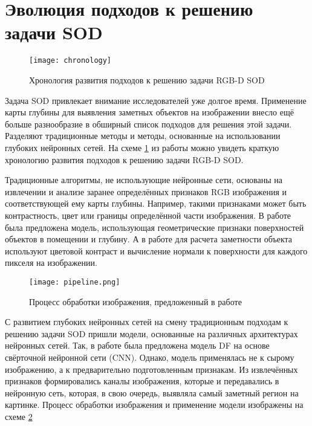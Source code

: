 \section{Эволюция подходов к решению задачи SOD}

\begin{figure}
    \centering
    \texttt{[image: chronology]}
    \caption{Хронология развития подходов к решению задачи RGB-D SOD}
    \label{fig:chronology}
\end{figure}

Задача SOD привлекает внимание исследователей уже долгое время. Применение карты глубины для выявления заметных объектов на изображении
внесло ещё больше разнообразие в обширный список подходов для решения этой задачи. Разделяют традиционные методы и методы, основанные
на использовании глубоких нейронных сетей. На схеме \ref{fig:chronology} из работы \cite{Survey} можно увидеть краткую хронологию развития
подходов к решению задачи RGB-D SOD.


Традиционные алгоритмы, не использующие нейронные сети, основаны на извлечении и анализе заранее определённых признаков RGB изображения и соответствующей ему карты глубины.
Например, такими признаками может быть контрастность, цвет или границы определённой части изображения.
В работе \cite{Depth-really-Matters} была предложена модель, использующая геометрические признаки поверхностей объектов в помещении и глубину.
А в работе \cite{Depth-View-of-Saliency} для расчета заметности объекта используют цветовой контраст и вычисление нормали к поверхности\cite{Surface-Normal} для каждого пикселя на изображении.

\begin{figure}
    \centering
    \texttt{[image: pipeline.png]}
    \caption{Процесс обработки изображения, предложенный в работе \cite{RGBD-SOD-Deep-Fusion}}
    \label{fig:pipeline}
\end{figure}

С развитием глубоких нейронных сетей на смену традиционным подходам к решению задачи SOD пришли модели, основанные на различных архитектурах нейронных сетей.
Так, в работе \cite{RGBD-SOD-Deep-Fusion} была предложена модель DF на основе свёрточной нейронной сети (CNN). Однако, модель применялась не к сырому изображению,
а к предварительно подготовленным признакам. Из извлечённых признаков формировались каналы изображения, которые и передавались в нейронную сеть, которая, в свою очередь,
выявляла самый заметный регион на картинке. Процесс обработки изображения и применение модели изображены на схеме \ref{fig:pipeline}


